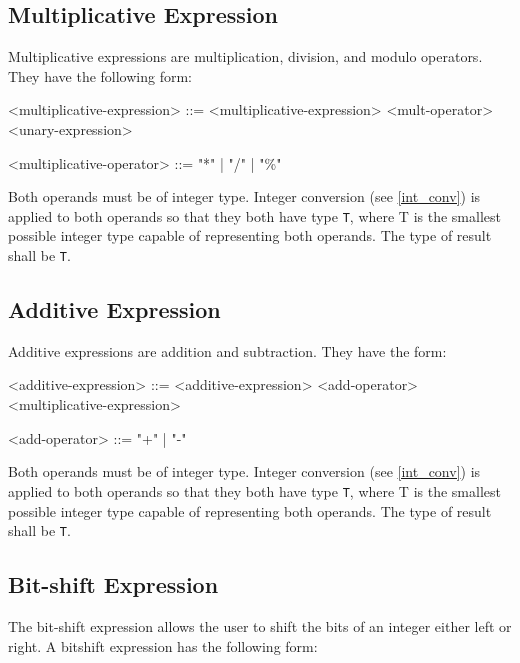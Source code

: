 \subsection{Multiplicative Expression} \label{mult_expr_guide}

Multiplicative expressions are multiplication, division, and modulo operators. They have the following form:

\begin{minip}
\begin{grammar}
<multiplicative-expression> ::= <multiplicative-expression> 
<mult-operator> <unary-expression>

<multiplicative-operator> ::= "*" | "/" | "\%"
\end{grammar}
\end{minip}

Both operands must be of integer type. Integer conversion (see \ref{int_conv}) is applied to both operands so that they both have type \texttt{T}, where T is the smallest possible integer type capable of representing both operands. The type of result shall be \texttt{T}. 

\subsection{Additive Expression} \label{add_expr_guide}

Additive expressions are addition and subtraction. They have the form: 

\begin{minip}
\begin{grammar}
<additive-expression> ::= <additive-expression> 
<add-operator> <multiplicative-expression>

<add-operator> ::= "+" | "-"
\end{grammar}
\end{minip}

Both operands must be of integer type. Integer conversion (see \ref{int_conv}) is applied to both operands so that they both have type \texttt{T}, where T is the smallest possible integer type capable of representing both operands. The type of result shall be \texttt{T}.

\subsection{Bit-shift Expression} \label{bit_shift_guide}

The bit-shift expression allows the user to shift the bits of an integer either left or right. A bitshift expression has the following form:

